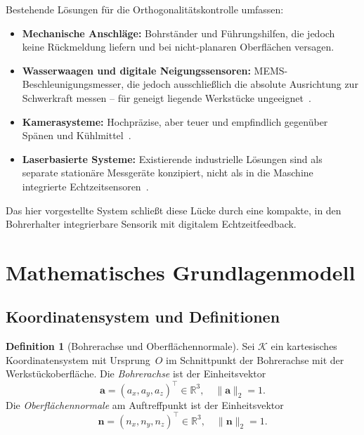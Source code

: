 ﻿\documentclass[a4paper,12pt]{article}
\theoremstyle{definition}
\newtheorem{definition}{Definition}
\begin{document}
Bestehende Lösungen für die Orthogonalitätskontrolle umfassen:
\begin{itemize}
  \item \textbf{Mechanische Anschläge:} Bohrständer und Führungshilfen, die
    jedoch keine Rückmeldung liefern und bei nicht-planaren Oberflächen versagen.
  \item \textbf{Wasserwaagen und digitale Neigungssensoren:} MEMS-Beschleunigungs\-messer,
    die jedoch ausschließlich die absolute Ausrichtung zur Schwerkraft messen --
    für geneigt liegende Werkstücke ungeeignet~\cite{fraden2010handbook}.
  \item \textbf{Kamerasysteme:} Hochpräzise, aber teuer und empfindlich gegenüber
    Spänen und Kühlmittel~\cite{jaehne2005digitale}.
  \item \textbf{Laserbasierte Systeme:} Existierende industrielle Lösungen sind
    als separate stationäre Messgeräte konzipiert, nicht als in die Ma\-schine
    integrierte Echtzeit\-sensoren~\cite{schwenke2008geometric}.
\end{itemize}

Das hier vorgestellte System schließt diese Lücke durch eine kompakte,
in den Bohrerhalter integrierbare Sensorik mit digitalem Echtzeitfeedback.

\section{Mathematisches Grundlagenmodell}

\subsection{Koordinatensystem und Definitionen}

\begin{definition}[Bohrerachse und Oberflächennormale]
  Sei $\mathcal{K}$ ein kartesisches Koordinatensystem mit Ursprung~$O$ im
  Schnittpunkt der Bohrerachse mit der Werkstückoberfläche.
  Die \emph{Bohrerachse} ist der Einheitsvektor
  \[
    \mathbf{a} = (a_x, a_y, a_z)^\top \in \mathbb{R}^3, \quad \|\mathbf{a}\|_2 = 1.
  \]
  Die \emph{Oberflächennormale} am Auftreffpunkt ist der Einheitsvektor
  \[
    \mathbf{n} = (n_x, n_y, n_z)^\top \in \mathbb{R}^3, \quad \|\mathbf{n}\|_2 = 1.
  \]
\end{definition}
\end{document}
